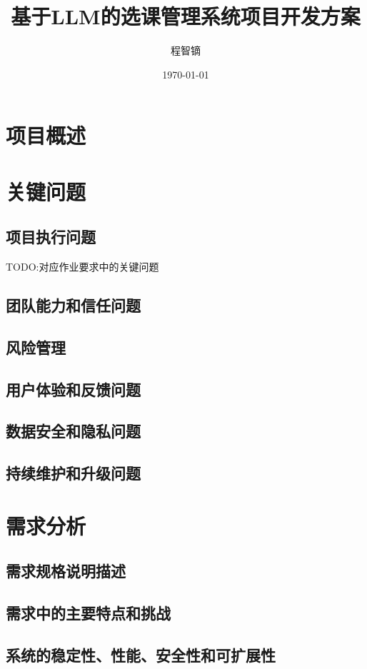 \documentclass{article}
\title{基于LLM的选课管理系统项目开发方案}
\author{程智镝}
\date{\today}
\begin{document}
\maketitle

\tableofcontents

\newpage

\section{项目概述}

\section{关键问题}
\subsection{项目执行问题}
TODO:对应作业要求中的关键问题
\subsection{团队能力和信任问题}
\subsection{风险管理}
\subsection{用户体验和反馈问题}
\subsection{数据安全和隐私问题}
\subsection{持续维护和升级问题}
\section{需求分析}
\subsection{需求规格说明描述}
\subsection{需求中的主要特点和挑战}
\subsection{系统的稳定性、性能、安全性和可扩展性}
\end{document}
